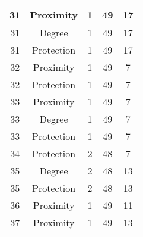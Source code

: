 \documentclass[results.tex]{subfiles}
\begin{document}
\begin{center}
\begin{tabular}{| c || c | c | c | c |}
            \hline
            31                      & Proximity                    & 1                      & 49                      & 17                   \\
            \hline
            31                      & Degree                       & 1                      & 49                      & 17                   \\
            \hline
            31                      & Protection                   & 1                      & 49                      & 17                   \\
            \hline
            32                      & Proximity                    & 1                      & 49                      & 7                    \\
            \hline
            32                      & Protection                   & 1                      & 49                      & 7                    \\
            \hline
            33                      & Proximity                    & 1                      & 49                      & 7                    \\
            \hline
            33                      & Degree                       & 1                      & 49                      & 7                    \\
            \hline
            33                      & Protection                   & 1                      & 49                      & 7                    \\
            \hline
            34                      & Protection                   & 2                      & 48                      & 7                    \\
            \hline
            35                      & Degree                       & 2                      & 48                      & 13                   \\
            \hline
            35                      & Protection                   & 2                      & 48                      & 13                   \\
            \hline
            36                      & Proximity                    & 1                      & 49                      & 11                   \\
            \hline
            37                      & Proximity                    & 1                      & 49                      & 13                   \\

\end{tabular}
\end{center}
\end{document}
